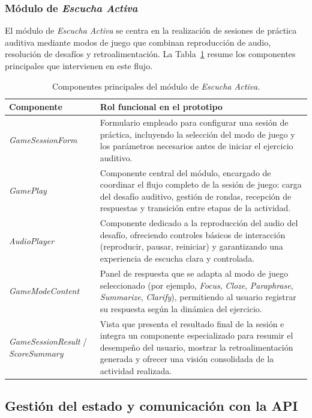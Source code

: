 \subsubsection{Módulo de \textit{Escucha Activa}}

El módulo de \textit{Escucha Activa} se centra en la realización de sesiones de práctica auditiva mediante modos de juego que combinan reproducción de audio, resolución de desafíos y retroalimentación. La Tabla~\ref{tab:componentes-escucha-activa} resume los componentes principales que intervienen en este flujo.

\begin{table}[H]
\centering
\footnotesize
\begin{tabular}{| m{3.5cm} | m{11cm} |}
\hline
\textbf{Componente} & \textbf{Rol funcional en el prototipo} \\
\hline
\textit{GameSessionForm} & Formulario empleado para configurar una sesión de práctica, incluyendo la selección del modo de juego y los parámetros necesarios antes de iniciar el ejercicio auditivo. \\
\hline
\textit{GamePlay} & Componente central del módulo, encargado de coordinar el flujo completo de la sesión de juego: carga del desafío auditivo, gestión de rondas, recepción de respuestas y transición entre etapas de la actividad. \\
\hline
\textit{AudioPlayer} & Componente dedicado a la reproducción del audio del desafío, ofreciendo controles básicos de interacción (reproducir, pausar, reiniciar) y garantizando una experiencia de escucha clara y controlada. \\
\hline
\textit{GameModeContent} & Panel de respuesta que se adapta al modo de juego seleccionado (por ejemplo, \textit{Focus}, \textit{Cloze}, \textit{Paraphrase}, \textit{Summarize}, \textit{Clarify}), permitiendo al usuario registrar su respuesta según la dinámica del ejercicio. \\
\hline
\textit{GameSessionResult} / \textit{ScoreSummary} & Vista que presenta el resultado final de la sesión e integra un componente especializado para resumir el desempeño del usuario, mostrar la retroalimentación generada y ofrecer una visión consolidada de la actividad realizada. \\
\hline
\end{tabular}
\caption{Componentes principales del módulo de \textit{Escucha Activa}.}
\label{tab:componentes-escucha-activa}
\end{table}

\subsection{Gestión del estado y comunicación con la API}

